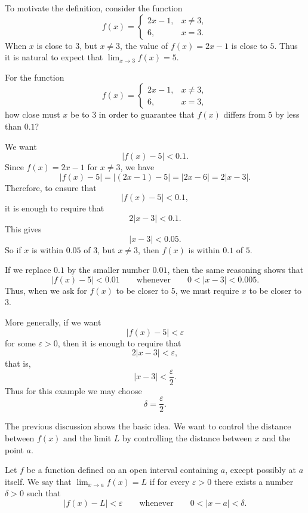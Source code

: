 To motivate the definition, consider the function
\[
f(x)=
\begin{cases}
2x-1, & x\ne 3,\\[4pt]
6, & x=3.
\end{cases}
\]
When \(x\) is close to \(3\), but \(x\ne 3\), the value of \(f(x)=2x-1\) is close to \(5\). Thus it is natural to expect that
\(\displaystyle
\lim_{x\to 3} f(x)=5.
\)

\begin{example}
For the function
\[
f(x)=
\begin{cases}
2x-1, & x\ne 3,\\[4pt]
6, & x=3,
\end{cases}
\]
how close must \(x\) be to \(3\) in order to guarantee that \(f(x)\) differs from \(5\) by less than \(0.1\)?
\end{example}

\begin{solution}
We want
\[
|f(x)-5|<0.1.
\]
Since \(f(x)=2x-1\) for \(x\ne 3\), we have
\[
|f(x)-5|
=
|(2x-1)-5|
=
|2x-6|
=
2|x-3|.
\]
Therefore, to ensure that
\[
|f(x)-5|<0.1,
\]
it is enough to require that
\[
2|x-3|<0.1.
\]
This gives
\[
|x-3|<0.05.
\]
So if \(x\) is within \(0.05\) of \(3\), but \(x\ne 3\), then \(f(x)\) is within \(0.1\) of \(5\).
\end{solution}

If we replace \(0.1\) by the smaller number \(0.01\), then the same reasoning shows that
\[
|f(x)-5|<0.01
\qquad \text{whenever} \qquad
0<|x-3|<0.005.
\]
Thus, when we ask for \(f(x)\) to be closer to \(5\), we must require \(x\) to be closer to \(3\).

More generally, if we want
\[
|f(x)-5|<\varepsilon
\]
for some \(\varepsilon>0\), then it is enough to require that
\[
2|x-3|<\varepsilon,
\]
that is,
\[
|x-3|<\frac{\varepsilon}{2}.
\]
Thus for this example we may choose
\[
\delta=\frac{\varepsilon}{2}.
\]

The previous discussion shows the basic idea. We want to control the distance between \(f(x)\) and the limit \(L\) by controlling the distance between \(x\) and the point \(a\).

\begin{definition}
Let \(f\) be a function defined on an open interval containing \(a\), except possibly at \(a\) itself. We say that
\(\displaystyle
\lim_{x\to a} f(x)=L
\)
if for every \(\varepsilon>0\) there exists a number \(\delta>0\) such that
\[
|f(x)-L|<\varepsilon
\qquad \text{whenever} \qquad
0<|x-a|<\delta.
\]
\end{definition}

